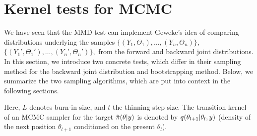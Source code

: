 \documentclass{article}
\newcommand{\tildepi}{\tilde{\pi}}
\begin{document}
\section{Kernel tests for MCMC}\label{sec:proposedtest}
We have seen that the MMD test can implement Geweke's idea of comparing distributions underlying the samples $\{(Y_1,\Theta_1),\ldots,(Y_n,\Theta_n)\}, $ $\{(Y_1',\Theta_1'),\ldots,(Y_n',\Theta_n')\}, $ from the forward and backward joint distributions. 
In this section, we introduce two concrete tests, which differ in their sampling method for the backward joint distribution and bootstrapping method. 
Below, we summarize the two sampling algorithms, which are put into context in the following sections. 

Here, $L$ denotes burn-in size, and $t$ the thinning step size. The transition kernel of an MCMC sampler for the target $\tildepi(\theta\given y)$ is denoted by $q(\theta_{l+1} \vert \theta_l, y)$ (density of the next position $\theta_{l+1}$ conditioned on the present $\theta_l$). 
\end{document}
